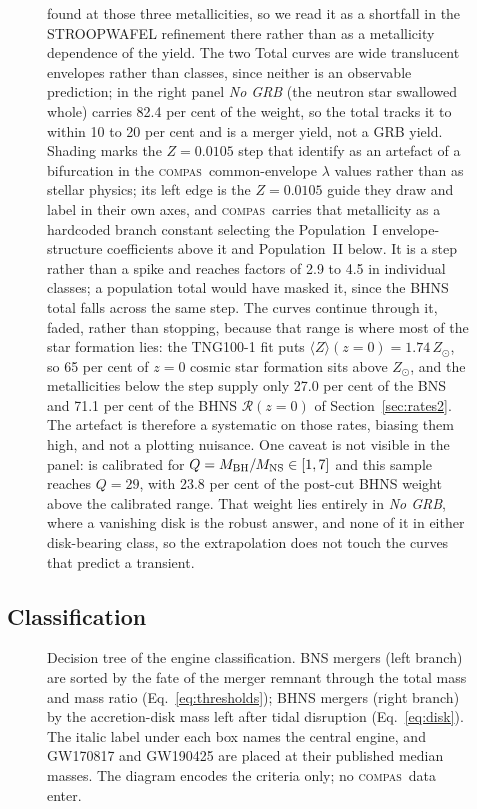 \documentclass[twocolumn,apj]{openjournal}
\newcommand{\compas}{\textsc{compas}}
\begin{document}
\begin{figure}[!tbp]
{found at those three metallicities, so we read it as a shortfall in the
STROOPWAFEL refinement there rather than as a metallicity dependence of the
yield. The two Total curves are wide translucent envelopes
rather than classes, since neither is an observable prediction; in the right
panel \textit{No GRB} (the neutron star swallowed whole) carries 82.4 per
cent of the weight, so the total tracks it to within 10 to 20 per cent and is
a merger yield, not a GRB yield.
Shading marks the $Z=0.0105$ step that
\citet[][their Fig.~1]{broekgaarden2022} identify as an artefact of a
bifurcation in the \compas\ common-envelope $\lambda$ values rather than as
stellar physics; its left edge is the $Z=0.0105$ guide they draw and label in
their own axes, and \compas\ carries that metallicity as a hardcoded branch
constant selecting the \citet{xu2010} Population~I envelope-structure
coefficients above it and Population~II below. It is a step rather than a spike and reaches factors of 2.9
to 4.5 in individual classes; a population total would have masked it, since
the BHNS total falls across the same step. The curves continue through it,
faded, rather than stopping, because that range is where most of the star
formation lies: the \citet{levina2026} TNG100-1 fit puts
$\langle Z\rangle(z=0)=1.74\,Z_\odot$, so 65 per cent of $z=0$ cosmic star
formation sits above $Z_\odot$, and the metallicities below the step supply
only 27.0 per cent of the BNS and 71.1 per cent of the BHNS $\mathcal{R}(z=0)$
of Section~\ref{sec:rates2}. The artefact is therefore
a systematic on those rates, biasing them high, and not a plotting nuisance.
One caveat is not visible in the panel: \citet{foucart2018} is calibrated for
$Q=M_{\rm BH}/M_{\rm NS}\in[1,7]$ and this sample reaches $Q=29$, with
23.8 per cent of the post-cut BHNS weight above the calibrated range. That
weight lies entirely in \textit{No GRB}, where a vanishing disk is the robust
answer, and none of it in either disk-bearing class, so the extrapolation
does not touch the curves that predict a transient.
\label{fig:delaytime}}
\end{figure}

\subsection{Classification} \label{sec:class}

\begin{figure}[!tbp]
\caption{Decision tree of the \citet{gottlieb2023,gottlieb2024} engine
classification. BNS mergers (left branch) are sorted by the fate of the
merger remnant through the total mass and mass ratio
(Eq.~\ref{eq:thresholds}); BHNS mergers (right branch) by the accretion-disk
mass left after tidal disruption (Eq.~\ref{eq:disk}). The italic label under
each box names the central engine, and GW170817 and GW190425 are placed at
their published median masses. The diagram encodes the criteria only; no
\compas\ data enter. \label{fig:scheme}}
\end{figure}
\end{document}
